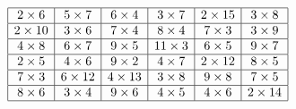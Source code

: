 \centerline{}
\renewcommand{\arraystretch}{1.5}
\[\begin{array}{|c|c|c|c|c|c|}
  \hline
  2\times6&5\times7&6\times4&3\times7&2\times15&3\times8\\
  \hline
  2\times10&3\times6&7\times4&8\times4&7\times3&3\times9\\
  \hline
  4\times8&6\times7&9\times5&11\times3&6\times5&9\times7\\
  \hline
  2\times5&4\times6&9\times2&4\times7&2\times12&8\times5\\
  \hline
  7\times3&6\times12&4\times13&3\times8&9\times8&7\times5\\
  \hline
  8\times6&3\times4&9\times6&4\times5&4\times6&2\times14\\
  \hline
\end{array}\]
\renewcommand{\arraystretch}{1}